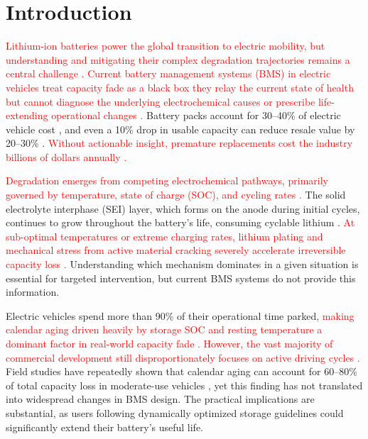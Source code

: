\documentclass[5p,times,authoryear]{elsarticle}
\begin{document}

\section{Introduction}


\textcolor{red}{Lithium-ion batteries power the global transition to electric mobility, but understanding and mitigating their complex degradation trajectories remains a central challenge \citep{hua2024review}. Current battery management systems (BMS) in electric vehicles treat capacity fade as a black box they relay the current state of health but cannot diagnose the underlying electrochemical causes or prescribe life-extending operational changes \citep{li2025advanced}.} Battery packs account for 30--40\% of electric vehicle cost \citep{ziegler2021determinants}, and even a 10\% drop in usable capacity can reduce resale value by 20--30\% \citep{saxena2019quantifying}. \textcolor{red}{Without actionable insight, premature replacements cost the industry billions of dollars annually \citep{harper2019recycling}.}

\textcolor{red}{Degradation emerges from competing electrochemical pathways, primarily governed by temperature, state of charge (SOC), and cycling rates \citep{hua2024review}.} The solid electrolyte interphase (SEI) layer, which forms on the anode during initial cycles, continues to grow throughout the battery's life, consuming cyclable lithium \citep{peled1979electrochemical}. \textcolor{red}{At sub-optimal temperatures or extreme charging rates, lithium plating and mechanical stress from active material cracking severely accelerate irreversible capacity loss \citep{li2025advanced}.} Understanding which mechanism dominates in a given situation is essential for targeted intervention, but current BMS systems do not provide this information.

Electric vehicles spend more than 90\% of their operational time parked, \textcolor{red}{making calendar aging driven heavily by storage SOC and resting temperature a dominant factor in real-world capacity fade \citep{hua2024review}.} \textcolor{red}{However, the vast majority of commercial development still disproportionately focuses on active driving cycles \citep{li2025advanced}.} Field studies have repeatedly shown that calendar aging can account for 60--80\% of total capacity loss in moderate-use vehicles \citep{saxena2019quantifying}, yet this finding has not translated into widespread changes in BMS design. The practical implications are substantial, as users following dynamically optimized storage guidelines could significantly extend their battery's useful life.
\end{document}
